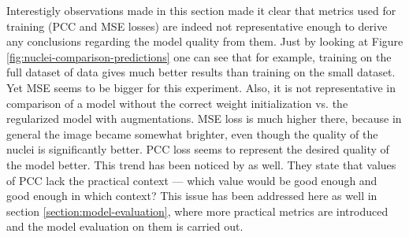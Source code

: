 Interestigly observations made in this section made it clear that metrics used for training (PCC and MSE losses) are indeed not representative enough to derive any conclusions regarding the model quality from them. Just by looking at Figure \ref{fig:nuclei-comparison-predictions} one can see that for example, training on the full dataset of data gives much better results than training on the small dataset. Yet MSE seems to be bigger for this experiment. Also, it is not representative in comparison of a model without the correct weight initialization vs. the regularized model with augmentations. MSE loss is much higher there, because in general the image became somewhat brighter, even though the quality of the nuclei is significantly better. PCC loss seems to represent the desired quality of the model better. This trend has been noticed by \cite{Lachance_2020} as well. They state that values of PCC lack the practical context --- which value would be good enough and good enough in which context? This issue has been addressed here as well in section \ref{section:model-evaluation}, where more practical metrics are introduced and the model evaluation on them is carried out.
